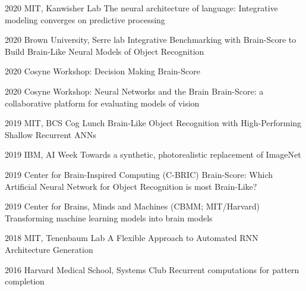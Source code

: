 {\presentation%
{%
2020  %
}{%
MIT, Kanwisher Lab
}{%
The neural architecture of language: Integrative modeling converges on predictive processing
}

\presentation%
{%
2020  %
}{%
Brown University, Serre lab
}{%
Integrative Benchmarking with Brain-Score to Build Brain-Like Neural Models of Object Recognition
}

\presentation%
{%
2020  %
}{%
Cosyne Workshop: Decision Making
}{%
Brain-Score
}

\presentation%
{%
2020  %
}{%
Cosyne Workshop: Neural Networks and the Brain %
}{%
Brain-Score: a collaborative platform for evaluating models of vision
}

\presentation%
{%
2019  %
}{%
MIT, BCS Cog Lunch
}{%
Brain-Like Object Recognition with High-Performing Shallow Recurrent ANNs
}

\presentation%
{%
2019  %
}{%
IBM, AI Week%
}{%
Towards a synthetic, photorealistic replacement of ImageNet
}

\presentation%
{%
2019  %
}{%
Center for Brain-Inspired Computing (C-BRIC)
}{%
Brain-Score: Which Artificial Neural Network for Object Recognition is most Brain-Like?
}

\presentation%
{%
2019  %
}{%
Center for Brains, Minds and Machines (CBMM; MIT/Harvard)
}{%
Transforming machine learning models into brain models
}

\presentation%
{%
2018  %
}{%
MIT, Tenenbaum Lab
}{%
A Flexible Approach to Automated RNN Architecture Generation
}

\presentation%
{%
2016  %
}{%
Harvard Medical School, Systems Club
}{%
Recurrent computations for pattern completion
}
}


